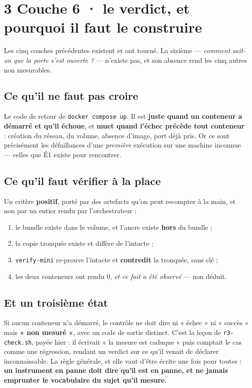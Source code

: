\documentclass[11pt]{article}
\newcommand{\code}[1]{\texttt{\small #1}}
\begin{document}
\section{3 \;\textbar\; Couche 6 · le verdict, et pourquoi il faut le construire}

Les cinq couches précédentes existent et ont tourné. La sixième --- \emph{comment sait-on que la
porte s'est ouverte ?} --- n'existe pas, et son absence rend les cinq autres non mesurables.

\subsection{Ce qu'il ne faut pas croire}
Le code de retour de \code{docker compose up}. Il est \textbf{juste quand un conteneur a démarré et
qu'il échoue}, et \textbf{muet quand l'échec précède tout conteneur} : création du réseau, du volume,
absence d'image, port déjà pris. Or ce sont précisément les défaillances d'une \emph{première}
exécution sur une machine inconnue --- celles que \mbox{É1} existe pour rencontrer.

\subsection{Ce qu'il faut vérifier à la place}
Un critère \textbf{positif}, porté par des artefacts qu'on peut recompter à la main, et non par un
entier rendu par l'orchestrateur :

\begin{enumerate}[leftmargin=1.4em,itemsep=1.5pt,topsep=2pt]
\item le bundle existe dans le volume, et l'ancre existe \textbf{hors} du bundle ;
\item la copie tronquée existe et diffère de l'intacte ;
\item \code{verify-mini} re-prouve l'intacte et \textbf{contredit} la tronquée, sans clé ;
\item les deux conteneurs ont rendu 0, \emph{et ce fait a été observé} --- non déduit.
\end{enumerate}

\subsection{Et un troisième état}
Si aucun conteneur n'a démarré, le contrôle ne doit dire ni « échec » ni « succès » mais
\textbf{« non mesuré »}, avec un code de sortie distinct. C'est la leçon de \code{r3-check.sh},
payée hier : il écrivait « la mesure est caduque » puis comptait le cas comme une régression, rendant
un verdict sur ce qu'il venait de déclarer inconnaissable. La règle générale, et elle vaut d'être
écrite une fois pour toutes : \textbf{un instrument en panne doit dire qu'il est en panne, et ne
jamais emprunter le vocabulaire du sujet qu'il mesure.}
\end{document}
